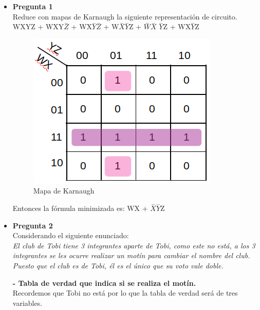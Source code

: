 \documentclass[11pt,letterpaper]{article}
\begin{document}
	
	\begin{itemize}
		\item \textbf{Pregunta 1}\\
		
		Reduce con mapas de Karnaugh la siguiente representación de circuito.\\
		
		WXYZ + WXY$\overset{-}{Z}$ + WX$\overset{-}{Y}$$\overset{-}{Z}$ + W$\overset{-}{X}$$\overset{-}{Y}$Z + $\overset{-}{W}$$\overset{-}{X}$ $\overset{-}{Y}$Z + WX$\overset{-}{Y}$Z
		
		\begin{figure}[h]
			\centering
			\includegraphics[scale=0.5]{MapaKarnaugh.png}
			\caption{Mapa de Karnaugh}
		\end{figure}
	
		Entonces la fórmula minimizada es: WX + $\overset{-}{X}$$\overset{-}{Y}$Z
		
		\item \textbf{Pregunta 2}\\
		
		Considerando el siguiente enunciado:\\
		
		\textit{El club de Tobi tiene 3 integrantes aparte de Tobi, como este no está, a los 3 integrantes se les ocurre realizar un motín para cambiar el nombre del club. Puesto que el club es de Tobi, él es el único que su voto vale doble.} 
		
		\subitem \textbf{- Tabla de verdad que indica si se realiza el motín.}\\
			\hspace*{0.85cm} Recordemos que Tobi no está por lo que la tabla de verdad será de tres variables.
			

\end{itemize}
\end{document}

